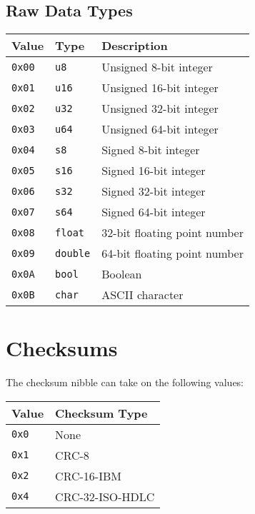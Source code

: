 \documentclass[a4paper]{article}
\begin{document}
\subsection{Raw Data Types}
\begin{longtable}{@{}lll@{}}
\toprule
Value    & Type             & Description                  \\
\midrule
\texttt{0x00} & \texttt{u8}       & Unsigned 8-bit integer       \\
\texttt{0x01} & \texttt{u16}      & Unsigned 16-bit integer      \\
\texttt{0x02} & \texttt{u32}      & Unsigned 32-bit integer      \\
\texttt{0x03} & \texttt{u64}      & Unsigned 64-bit integer      \\
\texttt{0x04} & \texttt{s8}       & Signed 8-bit integer         \\
\texttt{0x05} & \texttt{s16}      & Signed 16-bit integer        \\
\texttt{0x06} & \texttt{s32}      & Signed 32-bit integer        \\
\texttt{0x07} & \texttt{s64}      & Signed 64-bit integer        \\
\texttt{0x08} & \texttt{float}    & 32-bit floating point number \\
\texttt{0x09} & \texttt{double}   & 64-bit floating point number \\
\texttt{0x0A} & \texttt{bool}     & Boolean                      \\
\texttt{0x0B} & \texttt{char}     & ASCII character              \\
\bottomrule
\end{longtable}

\section{Checksums}\label{checksums}
The checksum nibble can take on the following values:
\begin{longtable}{@{}ll@{}}
\toprule
Value    & Checksum Type     \\
\midrule
\texttt{0x0} & None              \\
\texttt{0x1} & CRC-8             \\
\texttt{0x2} & CRC-16-IBM        \\
\texttt{0x4} & CRC-32-ISO-HDLC   \\
\bottomrule
\end{longtable}
\end{document}
